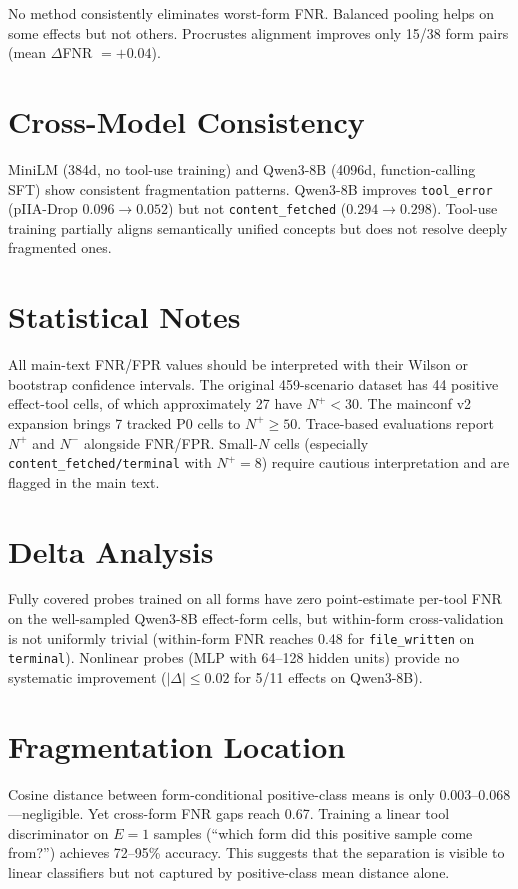 \documentclass{article}
\begin{document}
No method consistently eliminates worst-form FNR. Balanced pooling helps on some effects but not others. Procrustes alignment improves only 15/38 form pairs (mean $\Delta$FNR $=+0.04$).

\section{Cross-Model Consistency}

MiniLM (384d, no tool-use training) and Qwen3-8B (4096d, function-calling SFT) show consistent fragmentation patterns. Qwen3-8B improves \texttt{tool\_error} (pIIA-Drop $0.096 \to 0.052$) but not \texttt{content\_fetched} ($0.294 \to 0.298$). Tool-use training partially aligns semantically unified concepts but does not resolve deeply fragmented ones.

\section{Statistical Notes}

All main-text FNR/FPR values should be interpreted with their Wilson or bootstrap confidence intervals. The original 459-scenario dataset has 44 positive effect-tool cells, of which approximately 27 have $N^+ < 30$. The mainconf v2 expansion brings 7 tracked P0 cells to $N^+ \geq 50$. Trace-based evaluations report $N^+$ and $N^-$ alongside FNR/FPR. Small-$N$ cells (especially \texttt{content\_fetched/terminal} with $N^+=8$) require cautious interpretation and are flagged in the main text.

\section{Delta Analysis}

Fully covered probes trained on all forms have zero point-estimate per-tool FNR on the well-sampled Qwen3-8B effect-form cells, but within-form cross-validation is not uniformly trivial (within-form FNR reaches 0.48 for \texttt{file\_written} on \texttt{terminal}). Nonlinear probes (MLP with 64--128 hidden units) provide no systematic improvement ($|\Delta| \leq 0.02$ for 5/11 effects on Qwen3-8B).

\section{Fragmentation Location}

Cosine distance between form-conditional positive-class means is only 0.003--0.068---negligible. Yet cross-form FNR gaps reach 0.67. Training a linear tool discriminator on $E=1$ samples (``which form did this positive sample come from?'') achieves 72--95\% accuracy. This suggests that the separation is visible to linear classifiers but not captured by positive-class mean distance alone.
\end{document}

